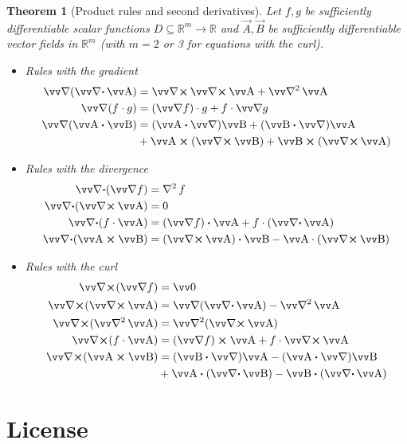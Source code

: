 \documentclass[twocolumn, margin=small]{tex/hsrzf}
\theoremstyle{fuvarzf}
\newtheorem{theorem}{Theorem}
\begin{document}
\begin{theorem}[Product rules and second derivatives]
  Let \(f,g\) be sufficiently differentiable scalar functions \(D
  \subseteq\mathbb{R}^m \to \mathbb{R}\) and \(\vec{A}, \vec{B}\) be
  sufficiently differentiable vector fields in \(\mathbb{R}^m\) (with \(m = 2\)
  or 3 for equations with the curl).
  \begin{itemize}
    \item Rules with the gradient
      \begin{align*}
        \grad (\div \vec{A}) &= \curl \curl \vec{A} + \vlaplacian \vec{A} \\
        \grad (f\cdot g) &= (\grad f)\cdot g + f\cdot \grad g \\
        \grad (\vec{A} \dotp \vec{B}) &= 
          (\vec{A} \dotp \grad) \vec{B}
          + (\vec{B} \dotp \grad) \vec{A} \\
          & + \vec{A} \crossp (\curl \vec{B})
          + \vec{B} \crossp (\curl \vec{A})
      \end{align*}
    \item Rules with the divergence
      \begin{align*}
        \div (\grad f) &= \laplacian f \\
        \div (\curl \vec{A}) &= 0 \\
        \div (f\cdot \vec{A}) &= (\grad f) \dotp \vec{A} + f\cdot (\div \vec{A}) \\
        \div (\vec{A}\crossp\vec{B}) &= (\curl \vec{A})\dotp \vec{B} 
          - \vec{A} \cdot (\curl\vec{B})
      \end{align*}
    \item Rules with the curl
      \begin{align*}
        \curl (\grad f) &= \vec{0} \\
        \curl (\curl \vec{A}) &= \grad (\div \vec{A}) - \vlaplacian \vec{A} \\
        \curl (\vlaplacian \vec{A}) &= \vlaplacian (\curl \vec{A}) \\
        \curl (f\cdot \vec{A}) &= (\grad f)\crossp \vec{A} + f\cdot \curl \vec{A} \\
        \curl (\vec{A}\crossp\vec{B}) &= 
          (\vec{B} \dotp \grad) \vec{A} - (\vec{A} \dotp \grad) \vec{B} \\
          &+ \vec{A} \dotp (\div \vec{B}) - \vec{B} \dotp (\div \vec{A})
      \end{align*}
  \end{itemize}
\end{theorem}

\section*{License}
\doclicenseText

\begin{center}
  \doclicenseImage
\end{center}
\end{document}
